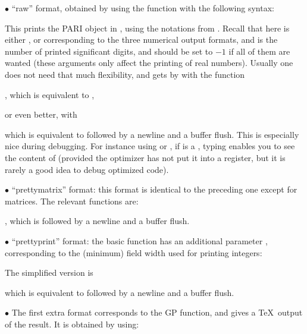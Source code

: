 \noindent $\bullet$ ``raw'' format, obtained by using the function
 with the following syntax:


\noindent
This prints the PARI object  in  , using the
notations from . Recall that here  is either
,  or  corresponding to the three numerical output
formats, and  is the number of printed significant digits, and should
be set to $-1$ if all of them are wanted (these arguments only affect the
printing of real numbers). Usually one does not need that much flexibility,
and gets by with the function

, which is equivalent to ,

\noindent or even better, with

 which is equivalent to 
followed by a newline and a buffer flush. This is especially nice during
debugging. For instance using  or , if  is a
, typing  enables you to see the
content of  (provided the optimizer has not put it into a
register, but it is rarely a good idea to debug optimized code).

\noindent $\bullet$ ``prettymatrix'' format: this format is identical to the
preceding one except for matrices. The relevant functions are:


, which is followed by a newline and a buffer flush.

\noindent $\bullet$ ``prettyprint'' format: the basic function has an
additional parameter , corresponding to the (minimum) field width
used for printing integers:


\noindent The simplified version is

 which is equivalent to
 followed by a newline and a buffer flush.

\noindent $\bullet$ The first extra format corresponds to the 
GP function, and gives a \TeX\ output of the result. It is obtained by
using:


